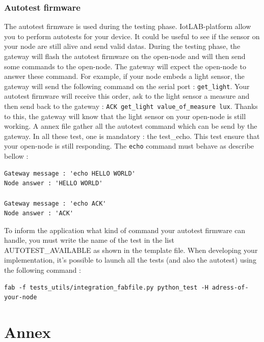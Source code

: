 \documentclass[12pt,a4paper,twoside]{article}
\begin{document}
\subsubsection{Autotest firmware}The autotest firmware is used during the testing phase. IotLAB-platform allow you to perform autotests for your device. It could be useful to see if the sensor on your node are still alive and send valid datas.\newline
During the testing phase, the gateway will flash the autotest firmware on the open-node and will then send some commands to the open-node. The gateway will expect the open-node to answer these command. For example, if your node embeds a light sensor, the gateway will send the following command on the serial port : \texttt{get\_light}. Your autotest firmware will receive this order, ask to the light sensor a measure and then send back to the gateway : \texttt{ACK get\_light value\_of\_measure lux}. Thanks to this, the gateway will know that the light sensor on your open-node is still working.\newline
A annex file gather all the autotest command which can be send by the gateway. In all these test, one is mandatory : the test\_echo. This test ensure that your open-node is still responding.\newline
The \texttt{echo} command must behave as describe bellow :
\begin{verbatim}
Gateway message : 'echo HELLO WORLD'
Node answer : 'HELLO WORLD'

Gateway message : 'echo ACK'
Node answer : 'ACK'
\end{verbatim}
To inform the application what kind of command your autotest firmware can handle, you must write the name of the test in the list AUTOTEST\_AVAILABLE as shown in the template file.\newline
When developing your implementation, it's possible to launch all the tests (and also the autotest) using the following command : \newline
\begin{verbatim}
fab -f tests_utils/integration_fabfile.py python_test -H adress-of-your-node
\end{verbatim}
\newpage
\section{Annex}
\end{document}
